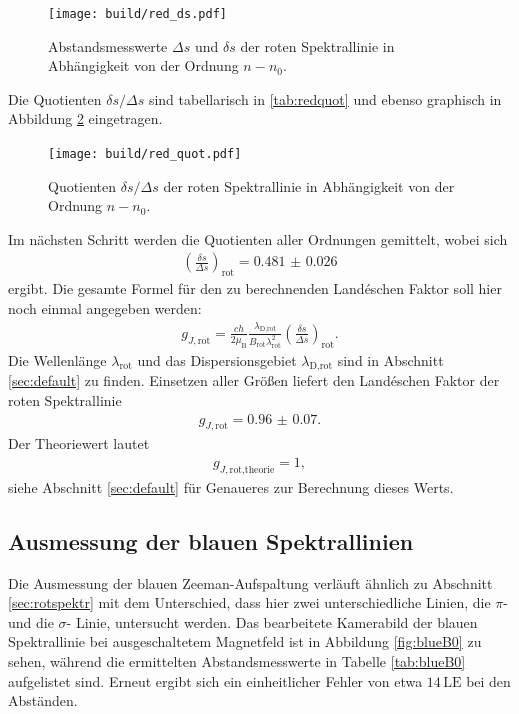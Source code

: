 \begin{figure}[H]
  \centering
  \texttt{[image: build/red\_ds.pdf]}
  \caption{Abstandsmesswerte $\Delta s$ und $\delta s$ der roten Spektrallinie in Abhängigkeit von der Ordnung $n-n_0$.}
  \label{fig:redds}
\end{figure}

Die Quotienten $\delta s/\Delta s$ sind tabellarisch in \ref{tab:redquot} und ebenso
graphisch in Abbildung \ref{fig:redquot} eingetragen.

\begin{figure}[H]
  \centering
  \texttt{[image: build/red\_quot.pdf]}
  \caption{Quotienten $\delta s/\Delta s$ der roten Spektrallinie in Abhängigkeit von der Ordnung $n-n_0$.}
  \label{fig:redquot}
\end{figure}

Im nächsten Schritt werden die Quotienten aller Ordnungen gemittelt, wobei sich
\begin{align}
  \left(\frac{\delta s}{\Delta s}\right)_\text{rot} = \num{0.481(26)}
\end{align}
ergibt. Die gesamte Formel für den zu berechnenden Landéschen Faktor soll hier noch
einmal angegeben werden:
\begin{align}
  g_{J,\text{rot}} = \frac{c h}{2 \mu_\text{B}} \frac{\lambda_\text{D,rot}}{B_\text{rot} \lambda_\text{rot}^2} \left(\frac{\delta s}{\Delta s}\right)_\text{rot}.
\end{align}
Die Wellenlänge $\lambda_\text{rot}$ und das Dispersionsgebiet $\lambda_\text{D,rot}$ sind in Abschnitt \ref{sec:default}
zu finden. Einsetzen aller Größen liefert den Landéschen Faktor der roten Spektrallinie
\begin{align}
  g_{J,\text{rot}} = \num{0.96(7)}.
\end{align}
Der Theoriewert lautet
\begin{align}
  g_{J,\text{rot,theorie}} = 1,
\end{align}
siehe Abschnitt \ref{sec:default} für Genaueres zur Berechnung dieses Werts.

\subsection{Ausmessung der blauen Spektrallinien}

Die Ausmessung der blauen Zeeman-Aufspaltung verläuft ähnlich zu Abschnitt \ref{sec:rotspektr}
mit dem Unterschied, dass hier zwei unterschiedliche Linien, die $\pi$- und die $\sigma$- Linie,
untersucht werden. Das bearbeitete Kamerabild der blauen Spektrallinie bei ausgeschaltetem Magnetfeld
ist in Abbildung \ref{fig:blueB0} zu sehen, während die ermittelten Abstandsmesswerte in Tabelle \ref{tab:blueB0}
aufgelistet sind. Erneut ergibt sich ein einheitlicher Fehler von etwa $14 \, \text{LE}$ bei den
Abständen.

